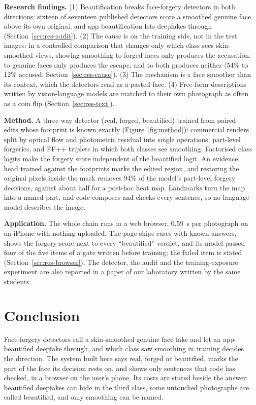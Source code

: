 \documentclass[conference,a4paper]{IEEEtran}
\begin{document}
\textbf{Research findings.} (1) Beautification breaks face-forgery detectors in both directions: sixteen of seventeen
published detectors score a smoothed genuine face above its own original, and app beautification lets deepfakes through
(Section~\ref{sec:res-audit}). (2) The cause is on the training side, not in the test images: in a controlled comparison that
changes only which class sees skin-smoothed views, showing smoothing to forged faces only produces the accusation, to genuine
faces only produces the escape, and to both produces neither (54\% to 12\% accused, Section~\ref{sec:res-cause}). (3) The
mechanism is a face smoother than its context, which the detectors read as a pasted face. (4) Free-form descriptions written by
vision-language models are matched to their own photograph as often as a coin flip (Section~\ref{sec:res-text}).

\textbf{Method.} A three-way detector (real, forged, beautified) trained from paired edits whose footprint is known exactly
(Figure~\ref{fig:method}): commercial renders split by optical flow and photometric residual into single operations,
part-level forgeries, and FF++ triplets in which both classes see smoothing. Factorised class logits make the forgery score
independent of the beautified logit. An evidence head trained against the footprints marks the edited region, and restoring
the original pixels inside the mark removes 94\% of the model's part-level forgery decisions, against about half for a
post-hoc heat map. Landmarks turn the map into a named part, and code composes and checks every sentence, so no language
model describes the image.

\textbf{Application.} The whole chain runs in a web browser, 0.59~s per photograph on an iPhone with nothing uploaded. The
page ships cases with known answers, shows the forgery score next to every ``beautified'' verdict, and its model passed four
of the five items of a gate written before training; the failed item is stated (Section~\ref{sec:res-browser}).
The detector, the audit and the training-exposure experiment are also reported in a paper of our laboratory written by the
same students.

\section{Conclusion}

Face-forgery detectors call a skin-smoothed genuine face fake and let an app-beautified deepfake through, and which class saw
smoothing in training decides the direction. The system built here says real, forged or beautified, marks the part of the face
its decision rests on, and shows only sentences that code has checked, in a browser on the user's phone. Its costs are
stated beside the answer: beautified deepfakes can hide in the third class, some untouched photographs are called beautified,
and only smoothing can be named.



\end{document}
